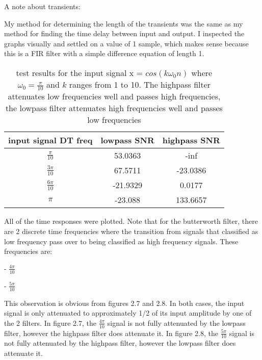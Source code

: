 \documentclass[12pt]{scrartcl} %
\begin{document}
		
		\vspace{5mm}
		
		A note about transients:
		
		\vspace{5mm}
		
		My method for determining the length of the transients was the same as my method for finding the time delay between input and output. I inspected the graphs visually and settled on a 
		value of 1 sample, which makes sense because this is a FIR filter with a simple difference equation of length 1. 
		
		\vspace{5mm}
		
			\begin{table}[H]
	\centering
	\begin{tabular}{||c c c ||} 
		\hline
		input signal DT freq & lowpass SNR & highpass SNR  \\ [0.5ex] 
		\hline\hline
		$\frac{\pi}{10}$ & 53.0363 & -inf \\
		\hline
		$\frac{3\pi}{10}$ & 67.5711 & -23.0386\\
		\hline
		$\frac{6\pi}{10}$ & -21.9329 & 0.0177\\
		\hline
		$\pi$ & -23.088 & 133.6657\\ [1ex] 
		\hline
	\end{tabular}
	\caption{test results for the input signal x = $cos(k \omega_0 n)$ where $\omega_0 = \frac{\pi}{10}$ and $k$ ranges from 1 to 10. The highpass filter attenuates low frequencies well and passes high frequencies, the lowpass filter attenuates high frequencies well and passes low frequencies}
\end{table}	
	
	All of the time responses were plotted. Note that for the butterworth filter, there are 2
	discrete time frequencies where the transition from signals that classified as low frequency 
	pass over to being classified as high frequency signals. These frequencies are: 

	\vspace{5mm}
	
	- $\frac{4\pi}{10}$
	
	\vspace{5mm}
	
	- $\frac{5\pi}{10}$
		
	\vspace{5mm}
	
	This observation is obvious from figures 2.7 and 2.8. In both cases, the input signal is only attenuated to approximately 1/2 of its input amplitude by one of the 2 filters. In figure 2.7, the $\frac{4\pi}{10}$ signal is not fully attenuated by the lowpass filter, however the highpass filter does attenuate it. In figure 2.8, the $\frac{5\pi}{10}$ signal is not fully attenuated by the highpass filter, however the lowpass filter does attenuate it.
	
\end{document}
